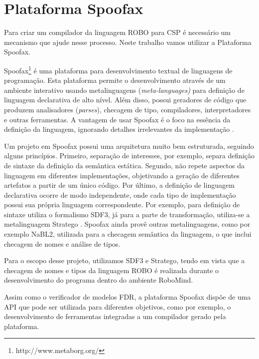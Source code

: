 \section{Plataforma Spoofax}
\label{sec:compilacao}

Para criar um compilador da linguagem ROBO para CSP é necessário um mecanismo que ajude nesse processo. Neste trabalho vamos utilizar a Plataforma Spoofax.

Spoofax\footnote[6]{http://www.metaborg.org/} é uma plataforma para desenvolvimento textual de linguagens de programação. Esta plataforma permite o desenvolvimento através de um ambiente interativo usando metalinguagens (\textit{meta-languages)} para definição de linguagem declarativa de alto nível. Além disso, possui geradores de código que produzem analisadores (\textit{parses}), checagem de tipo, compiladores, interpretadores e outras ferramentas. A vantagem de usar Spoofax é o foco na essência da definição da linguagem, ignorando detalhes irrelevantes da implementação \cite{KatsSpoofax}.

Um projeto em Spoofax possui uma arquitetura muito bem estruturada, seguindo alguns princípios. Primeiro, separação de interesses, por exemplo, separa definição de sintaxe da definição da semântica estática. Segundo, não repete aspectos da linguagem em diferentes implementações, objetivando a geração de diferentes artefatos a partir de um único código. Por último, a definição de linguagem declarativa ocorre de modo independente, onde cada tipo de implementação possui sua própria linguagem correspondente. Por exemplo, para definição de sintaxe utiliza o formalismo SDF3, já para a parte de transformação, utiliza-se a metalinguagem Stratego \cite{KatsSpoofax}. Spoofax ainda provê outras metalinguagens, como por exemplo NaBL2, utilizada para a checagem semântica da linguagem, o que inclui checagem de nomes e análise de tipos. 

Para o escopo desse projeto, utilizamos SDF3 e Stratego, tendo em vista que a checagem de nomes e tipos da linguagem ROBO é realizada durante o desenvolvimento do programa dentro do ambiente RoboMind. 

Assim como o verificador de modelos FDR, a plataforma Spoofax dispõe de uma API que pode ser utilizada para diferentes objetivos, como por exemplo, o desenvolvimento de ferramentas integradas a um compilador gerado pela plataforma.

